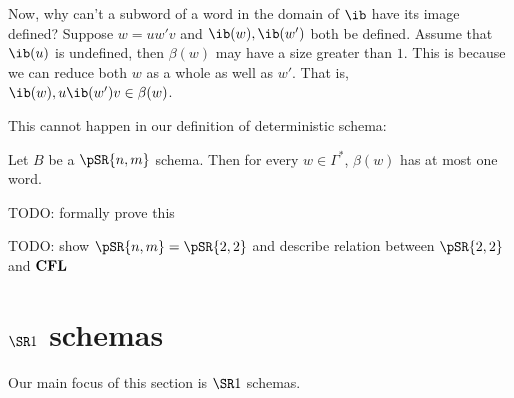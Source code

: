 \documentclass{llncs}
\newcommand{\ari}[1]{{\begin{mdframed}[linecolor=blue]{\color{blue}#1}\end{mdframed}}}
\begin{document}
Now, why can't a subword of a word in the domain of $\ib$ have its image defined?
Suppose $w=uw'v$ and $\ib(w),\ib(w')$ both be defined.
Assume that $\ib(u)$ is undefined, then $\beta(w)$ may have a size greater than $1$.
This is because we can reduce both $w$ as a whole as well as $w'$.
That is, $\ib(w),u\ib(w')v\in\beta(w)$.

This cannot happen in our definition of deterministic schema:

\begin{lemma}

    Let $B$ be a $\pSR{n,m}$ schema.
    Then for every $w\in\Gamma^*$, $\beta(w)$ has at most one word.

\end{lemma}

\ari{TODO: formally prove this}

\ari{TODO: show $\pSR{n,m}=\pSR{2,2}$ and describe relation between $\pSR{2,2}$ and $\hbox{{\bf CFL}}$}

\section{$\SR1$ schemas}

Our main focus of this section is $\SR1$ schemas.

%
%
%
\end{document}
